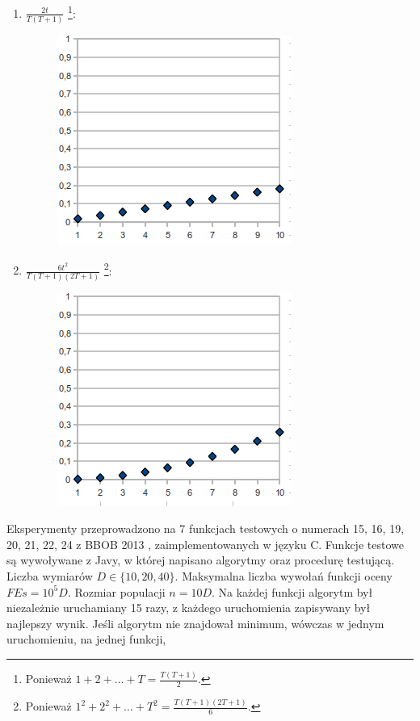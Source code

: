\documentclass[12pt, a4paper]{article}
\begin{document}
\begin{enumerate}
\begin{figure}[H]
  \end{figure}
 \item $\frac{2t}{T(T+1)}$
\footnote{Ponieważ $1 + 2 + \dots + T = \frac{T(T+1)}{2}$.}:
  \begin{figure}[H]
  \centering
  \includegraphics[scale=0.5]{img/4.png} 
  \end{figure}
 \item $\frac{6t^2}{T(T+1)(2T+1)}$
\footnote{Ponieważ $1^2 + 2^2 + \dots + T^2 = \frac{T(T+1)(2T+1)}{6}$.}:
  \begin{figure}[H]
  \centering
  \includegraphics[scale=0.5]{img/5.png} 
  \end{figure}
\end{enumerate}
Eksperymenty przeprowadzono na 7 funkcjach testowych o numerach 15, 16, 19, 20, 21, 22, 24 z BBOB 2013 \cite{finck, hansen}, 
zaimplementowanych w języku C.
Funkcje testowe są wywoływane z Javy, w której napisano algorytmy oraz procedurę testującą.
Liczba wymiarów $D \in \{10, 20, 40\}$. Maksymalna liczba wywołań funkcji oceny $FEs = 10^5D$. 
Rozmiar populacji $n = 10D$. 
Na każdej funkcji algorytm był niezależnie uruchamiany 15 razy, z każdego uruchomienia zapisywany był najlepszy wynik.
Jeśli algorytm nie znajdował minimum, wówczas w jednym uruchomieniu, na jednej funkcji, 
\end{document}
